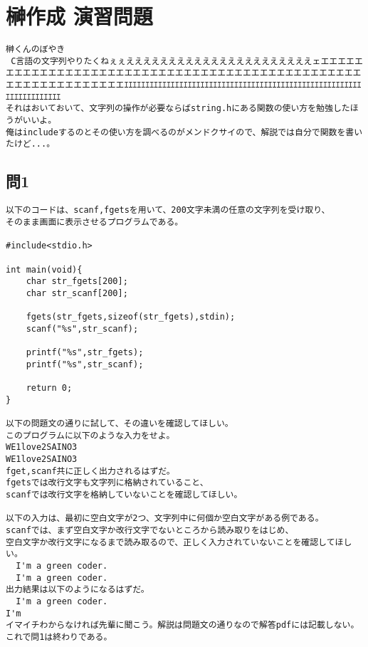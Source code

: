 \section{榊作成 演習問題}
\begin{verbatim}
榊くんのぼやき
 C言語の文字列やりたくねぇぇええええええええええええええええええええええェエエエエエエエエエエエエエエエエエエエエエエエエエエエエエエエエエエエエエエエエエエエエエエエエエエエエエエエエエエエエエｴｴｴｴｴｴｴｴｴｴｴｴｴｴｴｴｴｴｴｴｴｴｴｴｴｴｴｴｴｴｴｴｴｴｴｴｴｴｴｴｴｴｴｴｴｴｴｴｴｴｴｴｴｴｴｴｴｴｴｴｴｴｴｴｴｴｴｴｴ
それはおいておいて、文字列の操作が必要ならばstring.hにある関数の使い方を勉強したほうがいいよ。
俺はincludeするのとその使い方を調べるのがメンドクサイので、解説では自分で関数を書いたけど...。
\end{verbatim}

\subsection{問1}
\begin{verbatim}
以下のコードは、scanf,fgetsを用いて、200文字未満の任意の文字列を受け取り、
そのまま画面に表示させるプログラムである。

#include<stdio.h>

int main(void){
    char str_fgets[200];
	char str_scanf[200];
	
    fgets(str_fgets,sizeof(str_fgets),stdin);
    scanf("%s",str_scanf);
	
    printf("%s",str_fgets);
    printf("%s",str_scanf);
	
    return 0;
}

以下の問題文の通りに試して、その違いを確認してほしい。
このプログラムに以下のような入力をせよ。
WE1love2SAINO3
WE1love2SAINO3
fget,scanf共に正しく出力されるはずだ。
fgetsでは改行文字も文字列に格納されていること、
scanfでは改行文字を格納していないことを確認してほしい。

以下の入力は、最初に空白文字が2つ、文字列中に何個か空白文字がある例である。
scanfでは、まず空白文字か改行文字でないところから読み取りをはじめ、
空白文字か改行文字になるまで読み取るので、正しく入力されていないことを確認してほしい。
  I'm a green coder.
  I'm a green coder.
出力結果は以下のようになるはずだ。
  I'm a green coder.
I'm
イマイチわからなければ先輩に聞こう。解説は問題文の通りなので解答pdfには記載しない。
これで問1は終わりである。
\end{verbatim}

